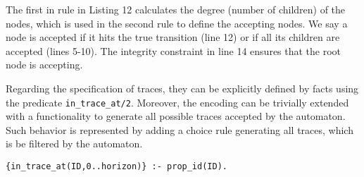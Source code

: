 The first in rule in Listing 12 calculates the degree (number of children) of the nodes, which is used in the second rule to define the accepting nodes. We say a node is accepted if it hits the true transition (line 12) or if all its children are accepted (lines 5-10). The integrity constraint in line 14 ensures that the root node is accepting.  


Regarding the specification of traces, they can be explicitly defined by facts using the predicate \texttt{in\_trace\_at/2}. Moreover, the encoding can be trivially extended with a functionality to generate all possible traces accepted by the automaton. Such behavior is represented by adding a choice rule generating all traces, which is be filtered by the automaton.

\begin{center}
    \begin{lstlisting}[] 
{in_trace_at(ID,0..horizon)} :- prop_id(ID).

    \end{lstlisting}
\end{center}

